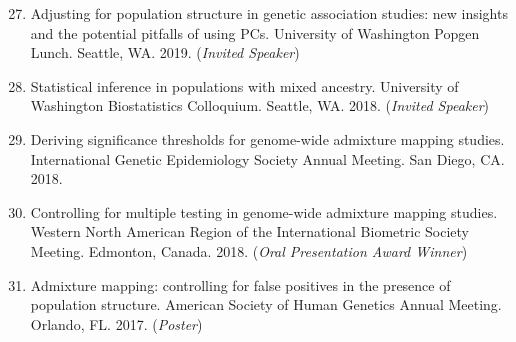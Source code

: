 \documentclass[margin]{res}
\newenvironment{benumerate}[1]{
    \let\oldItem\item
    \def\item{\addtocounter{enumi}{-2}\oldItem}
    
    \begin{enumerate}
    \setcounter{enumi}{#1}
    \addtocounter{enumi}{1}
}{
    \end{enumerate}
}
\begin{document}
\begin{resume}
\begin{benumerate}{26}
\item Adjusting for population structure in genetic association studies: new insights and the potential pitfalls of using PCs. University of Washington Popgen Lunch. Seattle, WA. 2019.  (\textit{Invited Speaker})




\item %
Statistical inference in populations with mixed ancestry. University of Washington Biostatistics Colloquium. Seattle, WA. 2018.  (\textit{Invited Speaker})

\item %
Deriving significance thresholds for genome-wide admixture mapping studies. International Genetic Epidemiology Society Annual Meeting. San Diego, CA. 2018. 


\item %
Controlling for multiple testing in genome-wide admixture mapping studies. Western North American Region of the International Biometric Society Meeting. Edmonton, Canada. 2018. (\textit{Oral Presentation Award Winner})



\item %
Admixture mapping: controlling for false positives in the presence of population structure. American Society of Human Genetics Annual Meeting. Orlando, FL. 2017. (\textit{Poster})


\end{benumerate}
\end{resume}
\end{document}
